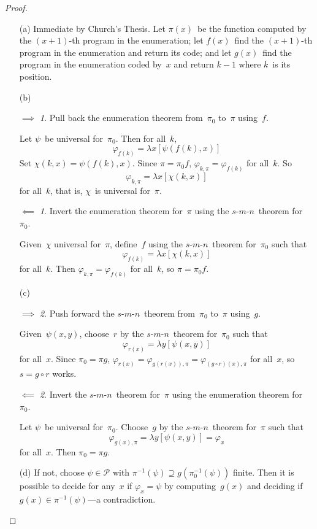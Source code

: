 \documentclass[letterpaper]{article}
\renewcommand{\P}{\mathcal{P}}
\newcommand{\smn}{$s$-$m$-$n$}
\theoremstyle{definition}
\theoremstyle{remark}
\theoremstyle{direction}
\newtheorem*{fwd}{$\implies$}
\newtheorem*{bwd}{$\impliedby$}
\begin{document}
\begin{proof}
\begin{enumerate}[itemsep=0pt]
\item[(a)] Immediate by Church's Thesis. Let $\pi(x)$~be the function computed by the $(x+1)$-th program in the enumeration; let $f(x)$~find the $(x+1)$-th program in the enumeration and return its code; and let $g(x)$~find the program in the enumeration coded by~$x$ and return $k-1$ where $k$~is its position.

\item[(b)]
\begin{fwd}
Pull back the enumeration theorem from~$\pi_0$ to~$\pi$ using~$f$.

Let $\psi$~be universal for~$\pi_0$. Then for all~$k$,
$$\varphi_{f(k)}=\lambda x[\psi(f(k),x)]$$
Set $\chi(k,x)=\psi(f(k),x)$. Since $\pi=\pi_0f$, $\varphi_{k,\pi}=\varphi_{f(k)}$ for all~$k$. So
$$\varphi_{k,\pi}=\lambda x[\chi(k,x)]$$
for all~$k$, that is, $\chi$~is universal for~$\pi$.
\end{fwd}
\begin{bwd}
Invert the enumeration theorem for~$\pi$ using the \smn\ theorem for~$\pi_0$.

Given~$\chi$ universal for~$\pi$, define~$f$ using the \smn\ theorem for~$\pi_0$ such that
$$\varphi_{f(k)}=\lambda x[\chi(k,x)]$$
for all~$k$. Then $\varphi_{k,\pi}=\varphi_{f(k)}$ for all~$k$, so $\pi=\pi_0f$.
\end{bwd}

\item[(c)]
\begin{fwd}
Push forward the \smn\ theorem from~$\pi_0$ to~$\pi$ using~$g$.

Given~$\psi(x,y)$, choose~$r$ by the \smn\ theorem for~$\pi_0$ such that
$$\varphi_{r(x)}=\lambda y[\psi(x,y)]$$
for all~$x$. Since $\pi_0=\pi g$, $\varphi_{r(x)}=\varphi_{g(r(x)),\pi}=\varphi_{(g\circ r)(x),\pi}$ for all~$x$, so $s=g\circ r$ works.
\end{fwd}
\begin{bwd}
Invert the \smn\ theorem for~$\pi$ using the enumeration theorem for~$\pi_0$.

Let $\psi$~be universal for~$\pi_0$. Choose~$g$ by the \smn\ theorem for~$\pi$ such that
$$\varphi_{g(x),\pi}=\lambda y[\psi(x,y)]=\varphi_x$$
for all~$x$. Then $\pi_0=\pi g$.
\end{bwd}

\item[(d)]
If not, choose $\psi\in\P$ with $\pi^{-1}(\psi)\supseteq g(\pi_0^{-1}(\psi))$ finite. Then it is possible to decide for any~$x$ if $\varphi_x=\psi$ by computing~$g(x)$ and deciding if $g(x)\in\pi^{-1}(\psi)$---a contradiction.\qedhere
\end{enumerate}
\end{proof}
\end{document}
